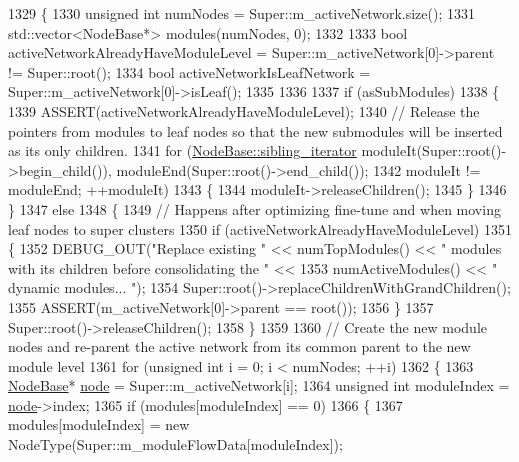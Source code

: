 \begin{DoxyCode}
1329 \{
1330     \textcolor{keywordtype}{unsigned} \textcolor{keywordtype}{int} numNodes = Super::m\_activeNetwork.size();
1331     std::vector<NodeBase*> modules(numNodes, 0);
1332 
1333     \textcolor{keywordtype}{bool} activeNetworkAlreadyHaveModuleLevel = Super::m\_activeNetwork[0]->parent != Super::root();
1334     \textcolor{keywordtype}{bool} activeNetworkIsLeafNetwork = Super::m\_activeNetwork[0]->isLeaf();
1335 
1336 
1337     \textcolor{keywordflow}{if} (asSubModules)
1338     \{
1339         ASSERT(activeNetworkAlreadyHaveModuleLevel);
1340         \textcolor{comment}{// Release the pointers from modules to leaf nodes so that the new submodules will be inserted as
       its only children.}
1341         \textcolor{keywordflow}{for} (\mbox{\hyperlink{classSiblingIterator}{NodeBase::sibling\_iterator}} moduleIt(Super::root()->begin\_child()), 
      moduleEnd(Super::root()->end\_child());
1342                 moduleIt != moduleEnd; ++moduleIt)
1343         \{
1344             moduleIt->releaseChildren();
1345         \}
1346     \}
1347     \textcolor{keywordflow}{else}
1348     \{
1349         \textcolor{comment}{// Happens after optimizing fine-tune and when moving leaf nodes to super clusters}
1350         \textcolor{keywordflow}{if} (activeNetworkAlreadyHaveModuleLevel)
1351         \{
1352             DEBUG\_OUT(\textcolor{stringliteral}{"Replace existing "} << numTopModules() << \textcolor{stringliteral}{" modules with its children before
       consolidating the "} <<
1353                     numActiveModules() << \textcolor{stringliteral}{" dynamic modules... "});
1354             Super::root()->replaceChildrenWithGrandChildren();
1355             ASSERT(m\_activeNetwork[0]->parent == root());
1356         \}
1357         Super::root()->releaseChildren();
1358     \}
1359 
1360     \textcolor{comment}{// Create the new module nodes and re-parent the active network from its common parent to the new
       module level}
1361     \textcolor{keywordflow}{for} (\textcolor{keywordtype}{unsigned} \textcolor{keywordtype}{int} i = 0; i < numNodes; ++i)
1362     \{
1363         \mbox{\hyperlink{classNodeBase}{NodeBase}}* \mbox{\hyperlink{structnode}{node}} = Super::m\_activeNetwork[i];
1364         \textcolor{keywordtype}{unsigned} \textcolor{keywordtype}{int} moduleIndex = \mbox{\hyperlink{structnode}{node}}->index;
1365         \textcolor{keywordflow}{if} (modules[moduleIndex] == 0)
1366         \{
1367             modules[moduleIndex] = \textcolor{keyword}{new} NodeType(Super::m\_moduleFlowData[moduleIndex]);

\end{DoxyCode}
